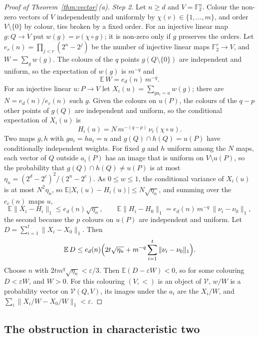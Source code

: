 \documentclass[11pt,a4paper]{article}
\theoremstyle{definition}
\newcommand{\V}{\mathcal{V}}
\newcommand{\F}{\mathbb{F}}
\begin{document}
\begin{proof}[Proof of Theorem~\ref{thm:vector}\,\textup{(a)}]
\emph{Step 2.} Let $n\ge d$ and $V=\F_2^n$. Colour the non-zero vectors of
$V$ independently and uniformly by $\chi(v)\in\{1,\dots,m\}$, and order
$V\setminus\{0\}$ by colour, ties broken by a fixed order. For an injective
linear map $g\colon Q\to V$ put $w(g)=\nu(\chi\circ g)$; it is non-zero only
if $g$ preserves the orders. Let $e_r(n)=\prod_{j<r}(2^n-2^j)$ be the
number of injective linear maps $\F_2^r\to V$, and $W=\sum_gw(g)$. The
colours of the $q$ points $g(Q\setminus\{0\})$ are independent and uniform,
so the expectation of $w(g)$ is $m^{-q}$ and
\[
 \mathbb{E}\,W=e_d(n)\,m^{-q}.
\]
For an injective linear $u\colon P\to V$ let
$X_i(u)=\sum_{ga_i=u}w(g)$; there are $N=e_d(n)/e_c(n)$ such $g$. Given the
colours on $u(P)$, the colours of the $q-p$ other points of $g(Q)$ are
independent and uniform, so the conditional expectation of $X_i(u)$ is
\[
 H_i(u)=N\,m^{-(q-p)}\,\nu_i(\chi\circ u).
\]
Two maps $g,h$ with $ga_i=ha_i=u$ and $g(Q)\cap h(Q)=u(P)$ have
conditionally independent weights. For fixed $g$ and $h$ uniform among the
$N$ maps, each vector of $Q$ outside $a_i(P)$ has an image that is uniform
on $V\setminus u(P)$, so the probability that $g(Q)\cap h(Q)\ne u(P)$ is at
most $\eta_n=(2^d-2^c)^2/(2^n-2^c)$. As $0\le w\le1$, the conditional
variance of $X_i(u)$ is at most $N^2\eta_n$, so
$\mathbb{E}|X_i(u)-H_i(u)|\le N\sqrt{\eta_n}$, and summing over the
$e_c(n)$ maps $u$,
\[
 \mathbb{E}\|X_i-H_i\|_1\le e_d(n)\sqrt{\eta_n},\qquad
 \mathbb{E}\|H_i-H_0\|_1=e_d(n)\,m^{-q}\,\|\nu_i-\nu_0\|_1 ,
\]
the second because the $p$ colours on $u(P)$ are independent and uniform.
Let $D=\sum_{i=1}^t\|X_i-X_0\|_1$. Then
\[
 \mathbb{E}\,D\le e_d(n)\Bigl(2t\sqrt{\eta_n}
 +m^{-q}\sum_{i=1}^t\|\nu_i-\nu_0\|_1\Bigr).
\]
Choose $n$ with $2tm^q\sqrt{\eta_n}<\varepsilon/3$. Then
$\mathbb{E}(D-\varepsilon W)<0$, so for some colouring $D<\varepsilon W$,
and $W>0$. For this colouring $(V,<)$ is an object of $\V$, $w/W$ is a
probability vector on $\V(Q,V)$, its images under the $a_i$ are the
$X_i/W$, and $\sum_i\|X_i/W-X_0/W\|_1<\varepsilon$.
\end{proof}

\subsection{The obstruction in characteristic two}
\end{document}
